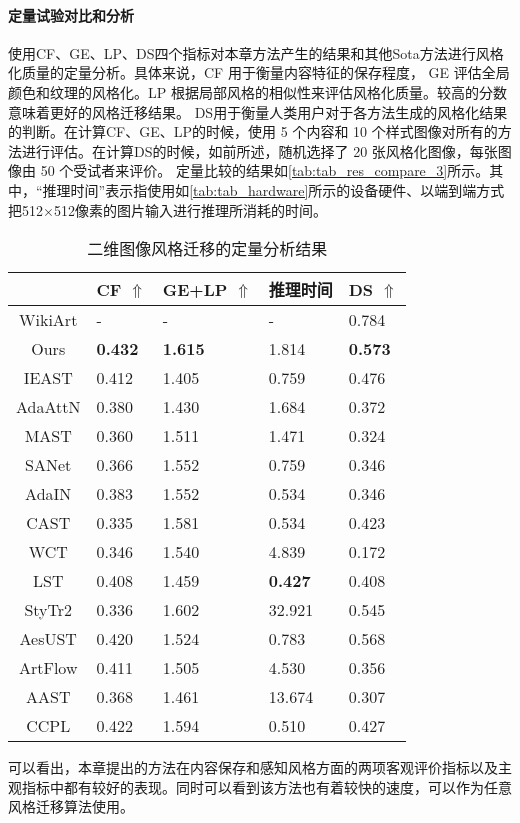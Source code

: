 \paragraph{定量试验对比和分析}
使用CF、GE、LP、DS四个指标对本章方法产生的结果和其他Sota方法进行风格化质量的定量分析。具体来说，CF 用于衡量内容特征的保存程度，
GE 评估全局颜色和纹理的风格化。LP 根据局部风格的相似性来评估风格化质量。较高的分数意味着更好的风格迁移结果。
DS用于衡量人类用户对于各方法生成的风格化结果的判断。在计算CF、GE、LP的时候，使用 5 个内容和 10 个样式图像对所有的方法进行评估。在计算DS的时候，如前所述，随机选择了 20 张风格化图像，每张图像由 50 个受试者来评价。
定量比较的结果如\autoref{tab:tab_res_compare_3}所示。其中，“推理时间”表示指使用如\autoref{tab:tab_hardware}所示的设备硬件、以端到端方式把512$\times$512像素的图片输入进行推理所消耗的时间。
\begin{table}[htb]
    \centering
    \caption{二维图像风格迁移的定量分析结果}
    \label{tab:tab_res_compare_3}
    \begin{tabularx}{\textwidth}{c X<{\centering} X<{\centering} X<{\centering} X<{\centering}}
        \hline
        & CF $\Uparrow$ & GE+LP $\Uparrow$ & 推理时间 & DS $\Uparrow$ \\ \hline
        WikiArt & - & - & - & 0.784 \\ 
        Ours & \textbf{0.432} & \textbf{1.615} & 1.814 & \textbf{0.573} \\
        IEAST & 0.412 & 1.405 & 0.759 & 0.476 \\ 
        AdaAttN & 0.380 & 1.430 & 1.684 & 0.372 \\ 
        MAST & 0.360 & 1.511 & 1.471 & 0.324 \\ 
        SANet & 0.366 & 1.552 & 0.759 & 0.346 \\ 
        AdaIN & 0.383 & 1.552 & 0.534 & 0.346 \\ 
        CAST & 0.335 & 1.581 & 0.534 & 0.423 \\ 
        WCT & 0.346 & 1.540 & 4.839 & 0.172 \\ 
        LST & 0.408 & 1.459 & \textbf{0.427} & 0.408 \\ 
        StyTr2 & 0.336 & 1.602 & 32.921 & 0.545 \\
        AesUST & 0.420 & 1.524 & 0.783 & 0.568 \\ 
        ArtFlow & 0.411 & 1.505 & 4.530 & 0.356 \\
        AAST & 0.368 & 1.461 & 13.674 & 0.307 \\ 
        CCPL & 0.422 & 1.594 & 0.510 & 0.427 \\ \hline
    \end{tabularx}
\end{table}
可以看出，本章提出的方法在内容保存和感知风格方面的两项客观评价指标以及主观指标中都有较好的表现。同时可以看到该方法也有着较快的速度，可以作为任意风格迁移算法使用。
